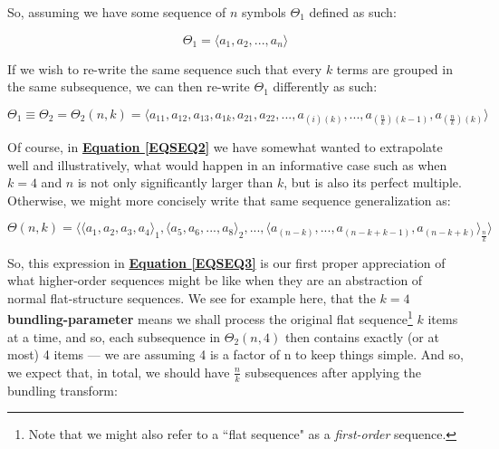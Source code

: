 \documentclass[a4paper, 18pt]{book} %
\begin{document}
So, assuming we have some sequence of $n$ symbols $\Theta_1$ defined as such:

\vspace{1em}

\begin{equation}
\label{EQSEQ1}
\Theta_1 = \langle a_1, a_2,...,a_n\rangle
\end{equation}

\vspace{1em}

If we wish to re-write the same sequence such that every $k$ terms are grouped in the same subsequence, we can then re-write $\Theta_1$ differently as such:

\vspace{1em}


\begin{equation}
\label{EQSEQ2}
\Theta_1 \equiv \Theta_2 = \Theta_2(n,k) = \langle a_{11}, a_{12}, a_{13}, a_{1k}, a_{21}, a_{22},...,a_{(i)(k)},...,a_{(\frac{n}{k})(k-1)},a_{(\frac{n}{k})(k)}\rangle
\end{equation}

\vspace{1em}

Of course, in \textbf{\hyperref[EQSEQ2]{Equation \ref{EQSEQ2}}} we have somewhat wanted to extrapolate well and illustratively, what would happen in an informative case such as when $k = 4$ and $n$ is not only significantly larger than $k$, but is also its perfect multiple. Otherwise, we might more concisely write that same sequence generalization as:

\vspace{1em}


\begin{equation}
\label{EQSEQ3}
\Theta(n,k) = \langle \langle a_1, a_2, a_3, a_4 \rangle_1, \langle a_5, a_6,...,a_8 \rangle_2,... , \langle a_{(n-k)},...,a_{(n-k+k-1)},a_{(n-k+k)}\rangle_{\frac{n}{k}} \rangle
\end{equation}

\vspace{1em}

So, this expression in \textbf{\hyperref[EQSEQ3]{Equation \ref{EQSEQ3}}} is our first proper appreciation of what higher-order sequences might be like when they are an abstraction of normal flat-structure sequences. We see for example here, that the $k=4$ \textbf{bundling-parameter} means we shall process the original flat sequence\footnote{Note that we might also refer to a ``flat sequence" as a \textit{first-order} sequence.} $k$ items at a time, and so, each subsequence in $\Theta_2(n,4)$ then contains exactly (or at most) 4 items --- we are assuming 4 is a factor of n to keep things simple. And so, we expect that, in total, we should have $\frac{n}{k}$ subsequences after applying the bundling transform:
\end{document}
